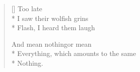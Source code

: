 \label{ch:lear_at}
\settowidth{\versewidth}{Everything, which amounts to the same}
\begin{verse}[\versewidth]
 \hspace*{2\vgap} Too late\\*
I saw their wolfish grins\\*
Flash, I heard them laugh

And mean nothing\quad or mean\\*
Everything, which amounts to the same\\*
Nothing.
\end{verse}
